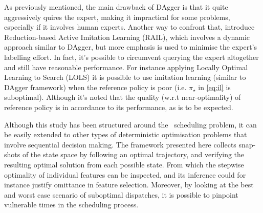 \documentclass[twocolumn]{svjour3}
\begin{document}
As previously mentioned, the main drawback of DAgger is that it quite 
aggressively 
quires the expert, making it impractical for some problems, 
especially if it involves human experts. 
Another way to confront that, \cite{Judah12} introduce Reduction-based Active 
Imitation 
Learning (RAIL), which involves a dynamic approach similar to DAgger, but more 
emphasis is used to minimise the expert's labelling effort.
In fact, it's possible to circumvent querying the expert altogether and still 
have reasonable performance. For instance applying Locally Optimal Learning to 
Search (LOLS) \cite{ChangKADL15} it is possible to use imitation learning 
(similar to DAgger framework) when the reference policy is poor (i.e. 
$\pi_\star$ in \cref{eq:il} is suboptimal). 
Although it's noted that the quality (w.r.t near-optimality) of reference 
policy is in accordance to its performance, as is to be expected. 

Although this study has been structured around the \jsp\ scheduling problem, 
it can be easily extended to other types of deterministic optimisation problems 
that involve sequential decision making. 
The framework presented here collects snap-shots of the state space by 
following an optimal trajectory, and verifying the resulting optimal solution 
from each possible state. 
From which the stepwise optimality of individual features can be inspected, 
and its inference could for instance justify omittance in feature selection. 
Moreover, by looking at the best and worst case scenario of suboptimal 
dispatches, it is possible to pinpoint vulnerable times in the scheduling 
process. 

 
  
\end{document}
